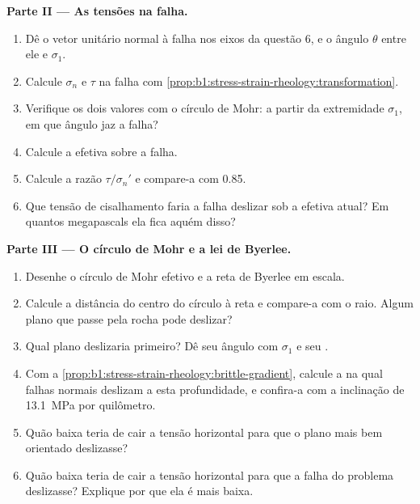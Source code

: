 \begin{problem}
\medskip
\noindent\textbf{Parte II --- As tensões na falha.}
\begin{enumerate}[resume]
  \item Dê o vetor unitário normal à falha nos eixos da questão 6, e o ângulo $\theta$ entre ele e $\sigma_1$.
  \item Calcule $\sigma_n$ e $\tau$ na falha com
        \cref{prop:b1:stress-strain-rheology:transformation}.
  \item Verifique os dois valores com o círculo de Mohr: a partir da extremidade $\sigma_1$, em que ângulo jaz a falha?
  \item Calcule a  efetiva sobre a falha.
  \item Calcule a razão $\tau/\sigma_n'$ e compare-a com 0.85.
  \item Que tensão de cisalhamento faria a falha deslizar sob a  efetiva atual? Em quantos megapascals ela fica aquém disso?
\end{enumerate}

\medskip
\noindent\textbf{Parte III --- O círculo de Mohr e a lei de Byerlee.}
\begin{enumerate}[resume]
  \item Desenhe o círculo de Mohr efetivo e a reta de Byerlee em escala.
  \item Calcule a distância do centro do círculo à reta e compare-a com o raio. Algum plano que passe pela rocha pode deslizar?
  \item Qual plano deslizaria primeiro? Dê seu ângulo com $\sigma_1$ e seu .
  \item Com a \cref{prop:b1:stress-strain-rheology:brittle-gradient}, calcule a  na qual falhas normais deslizam a esta profundidade, e confira-a com a inclinação de \qty{13.1}{MPa} por quilômetro.
  \item Quão baixa teria de cair a tensão horizontal para que o plano mais bem orientado deslizasse?
  \item Quão baixa teria de cair a tensão horizontal para que a falha do problema deslizasse? Explique por que ela é mais baixa.
\end{enumerate}


\end{problem}
